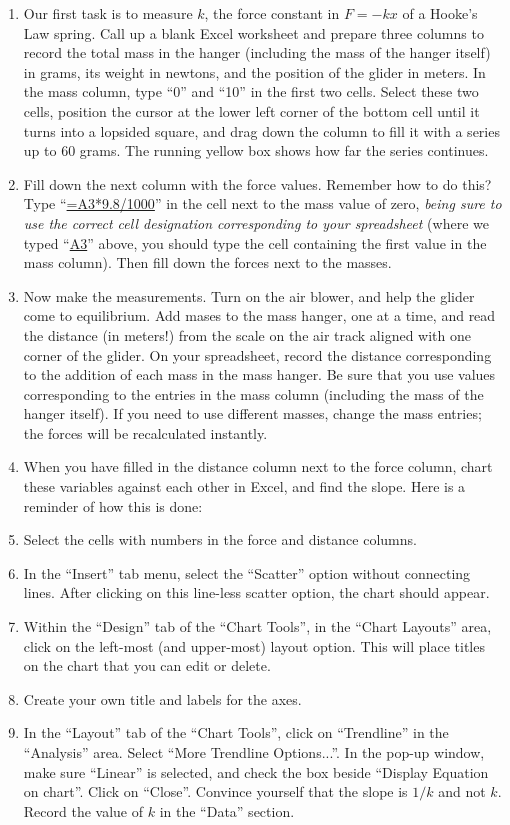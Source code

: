 \begin{enumerate}[label=\arabic*.]

\item Our first task is to measure \(k\), the force constant in \(F = -kx\) of a Hooke's Law spring.  Call up a blank Excel worksheet and prepare three columns to record the total mass in the hanger (including the mass of the hanger itself) in grams, its weight in newtons, and the position of the glider in meters.  In the mass column, type ``0'' and ``10'' in the first two cells.  Select these two cells, position the cursor at the lower left corner of the bottom cell until it turns into a lopsided square, and drag down the column to fill it with a series up to 60 grams.  The running yellow box shows how far the series continues.

\item Fill down the next column with the force values.  Remember how to do this?  Type ``\url{=A3*9.8/1000}'' in the cell next to the mass value of zero, \emph{being sure to use the correct cell designation corresponding to your spreadsheet} (where we typed ``\url{A3}'' above, you should type the cell containing the first value in the mass column).  Then fill down the forces next to the masses.

\item Now make the measurements.  Turn on the air blower, and help the glider come to equilibrium.  Add mases to the mass hanger, one at a time, and read the distance (in meters!) from the scale on the air track aligned with one corner of the glider.  On your spreadsheet, record the distance corresponding to the addition of each mass in the mass hanger.  Be sure that you use values corresponding to the entries in the mass column (including the mass of the hanger itself).  If you need to use different masses, change the mass entries; the forces will be recalculated instantly.

\item When you have filled in the distance column next to the force column, chart these variables against each other in Excel, and find the slope.  Here is a reminder of how this is done:
\squishlist
\item Select the cells with numbers in the force and distance columns.
\item In the ``Insert'' tab menu, select the ``Scatter'' option without connecting lines.  After clicking on this line-less scatter option, the chart should appear.
\item Within the ``Design'' tab of the ``Chart Tools'', in the ``Chart Layouts'' area, click on the left-most (and upper-most) layout option.  This will place titles on the chart that you can edit or delete.
\item Create your own title and labels for the axes.
\item In the ``Layout'' tab of the ``Chart Tools'', click on ``Trendline'' in the ``Analysis'' area.  Select ``More Trendline Options...''.  In the pop-up window, make sure ``Linear'' is selected, and check the box beside ``Display Equation on chart''.  Click on ``Close''.
\squishend
Convince yourself that the slope is \(1/k\) and not \(k\).  Record the value of \(k\) in the ``Data'' section.


\end{enumerate}
